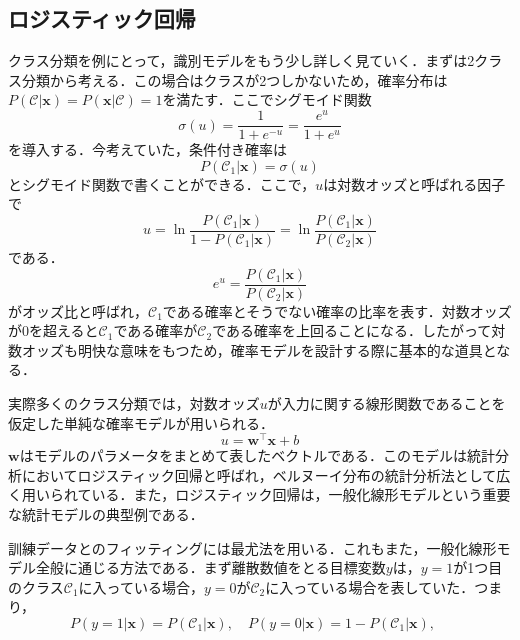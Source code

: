 \documentclass[a4paper,11pt]{jsreport}
\begin{document}
\subsection{ロジスティック回帰}
クラス分類を例にとって，識別モデルをもう少し詳しく見ていく．まずは2クラス分類から考える．この場合はクラスが2つしかないため，確率分布は$P(\mathcal{C} | \bm{x}) = P(\bm{x} | \mathcal{C}) = 1$を満たす．ここでシグモイド関数
\begin{equation}
  \sigma(u) 
  = \frac{1}{1 + e^{-u}}
  = \frac{e^u}{1 + e^u}
\end{equation}
を導入する．今考えていた，条件付き確率は
\begin{equation}
  P(\mathcal{C}_1 | \bm{x}) 
  = \sigma(u)
  \label{条件付き確率がシグモイド}
\end{equation}
とシグモイド関数で書くことができる．ここで，$u$は対数オッズと呼ばれる因子で
\begin{equation}
  u 
  = \ln{\frac{P(\mathcal{C}_1 | \bm{x})}{1 - P(\mathcal{C}_1 | \bm{x})}}
  = \ln{\frac{P(\mathcal{C}_1 | \bm{x})}{P(\mathcal{C}_2 | \bm{x})}}
\end{equation}
である．
\begin{equation}
  e^u
  = \frac{P(\mathcal{C}_1 | \bm{x})}{P(\mathcal{C}_2 | \bm{x})}
\end{equation}
がオッズ比と呼ばれ，$\mathcal{C}_1$である確率とそうでない確率の比率を表す．対数オッズが0を超えると$\mathcal{C}_1$である確率が$\mathcal{C}_2$である確率を上回ることになる．したがって対数オッズも明快な意味をもつため，確率モデルを設計する際に基本的な道具となる．\par
実際多くのクラス分類では，対数オッズ$u$が入力に関する線形関数であることを仮定した単純な確率モデルが用いられる．
\begin{equation}
  u = \bm{w}^{\top} \bm{x} + b
  \label{ロジスティック回帰}
\end{equation}
$\bm{w}$はモデルのパラメータをまとめて表したベクトルである．このモデルは統計分析においてロジスティック回帰と呼ばれ，ベルヌーイ分布の統計分析法として広く用いられている．また，ロジスティック回帰は，一般化線形モデルという重要な統計モデルの典型例である．\par
訓練データとのフィッティングには最尤法を用いる．これもまた，一般化線形モデル全般に通じる方法である．まず離散数値をとる目標変数$y$は，$y=1$が1つ目のクラス$\mathcal{C}_1$に入っている場合，$y=0$が$\mathcal{C}_2$に入っている場合を表していた．つまり，
\begin{equation}
  P(y=1 | \bm{x})
  = P(\mathcal{C}_1 | \bm{x}), \quad
  P(y=0 | \bm{x})
  = 1 - P(\mathcal{C}_1 | \bm{x}), \quad
\end{equation}
\end{document}
